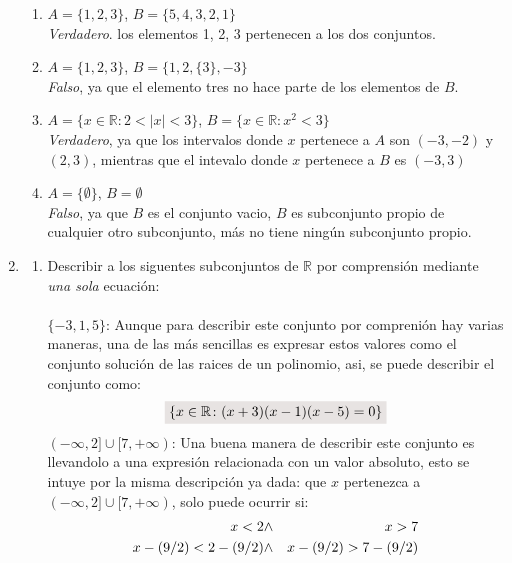 \documentclass[a4paper,11pt]{article}
\newcommand{\real}{\mathbb{R}}
\newcommand{\resalta}[1]{\colorbox{g}{$\displaystyle #1$}}
\begin{document}
\begin{enumerate}
\begin{enumerate}[label = \roman*)]
                \item $A=\{1,2,3\}$, $B=\{5,4,3,2,1\}$\\
                    \colorbox{g}{\textit{Verdadero}}. los elementos 1, 2, 3 pertenecen a los dos conjuntos.
                 \item $A=\{1,2,3\}$, $B=\{1,2,\{3\},-3\}$\\
                    \colorbox{g}{\textit{Falso}}, ya que el elemento tres no hace parte de los elementos de $B$.
                \item $A=\{x\in \mathbb{R} \colon 2<|x|<3\}$, $B=\{x\in \mathbb{R}\colon x^{2}<3\}$\\
                    \colorbox{g}{\textit{Verdadero}}, ya que los intervalos donde $x$ pertenece a $A$ son $(-3,-2)$ y $(2,3)$, mientras que el intevalo donde $x$ pertenece a $B$ es $(-3,3)$
                \item $A=\{\emptyset\}$, $B=\emptyset$\\
                    \colorbox{g}{\textit{Falso}}, ya que $B$ es el conjunto vacio, $B$ es subconjunto propio de cualquier otro subconjunto, m\'as no tiene ning\'un subconjunto propio.
            \end{enumerate}
        \item 
        \begin{enumerate}[label = \roman*)]
            \item Describir a los siguentes subconjuntos de $\real$ por comprensi\'on mediante \textit{una sola} ecuaci\'on:\\\\
            $\{-3,1,5\}$: 
            Aunque para describir este conjunto por compreni\'on hay varias maneras, una de las m\'as sencillas es expresar estos valores como el conjunto soluci\'on de las raices de un polinomio, asi, se puede describir el conjunto como:
            \begin{equation}
                \notag \resalta{\{x\in \mathbb{R}\colon (x+3)(x-1)(x-5)=0\}}
            \end{equation}
            $(-\infty,2]\cup[7,+\infty)$: Una buena manera de describir este conjunto es llevandolo a una expresi\'on relacionada con un valor absoluto, esto se intuye por la misma descripci\'on ya dada: que $x$ pertenezca a $(-\infty,2]\cup[7,+\infty)$, solo puede ocurrir si:
           \begin{eqnarray*}
             \notag
                x<2&\wedge& x>7\\
                x-(9/2)<2-(9/2)&\wedge& x-(9/2)>7-(9/2)\\

\end{eqnarray*}
\end{enumerate}
\end{enumerate}
\end{document}
